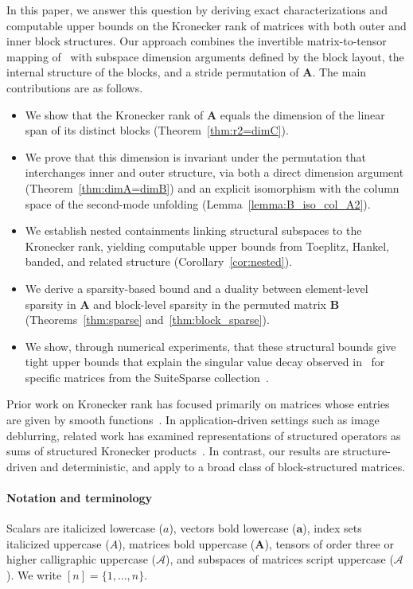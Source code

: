 \documentclass{siamart251216}
\newcommand{\tens}[1]{\mathbf{\mathcal{#1}}}
\def\bA{\mathbf{A}}
\def\bB{\mathbf{B}}
\def\ba{\mathbf{a}}
\begin{document}
In this paper, we answer this question by deriving exact characterizations and computable upper bounds on the Kronecker rank of matrices with both outer and inner block structures. Our approach combines the invertible matrix-to-tensor mapping of~\cite{kilmer2022matrixtensordecomp} with subspace dimension arguments defined by the block layout, the internal structure of the blocks, and a stride permutation of $\bA$. The main contributions are as follows.
\begin{itemize}
    \item We show that the Kronecker rank of $\bA$ equals the dimension of the linear span of its distinct blocks (Theorem~\ref{thm:r2=dimC}).
    \item We prove that this dimension is invariant under the permutation that interchanges inner and outer structure, via both a direct dimension argument (Theorem~\ref{thm:dimA=dimB}) and an explicit isomorphism with the column space of the second-mode unfolding (Lemma~\ref{lemma:B_iso_col_A2}).
    \item We establish nested containments linking structural subspaces to the Kronecker rank, yielding computable upper bounds from Toeplitz, Hankel, banded, and related structure (Corollary~\ref{cor:nested}).
    \item We derive a sparsity-based bound and a duality between element-level sparsity in $\bA$ and block-level sparsity in the permuted matrix $\bB$ (Theorems~\ref{thm:sparse} and~\ref{thm:block_sparse}).
    \item We show, through numerical experiments, that these structural bounds give tight upper bounds that explain the singular value decay observed in~\cite{kilmer2022matrixtensordecomp} for specific matrices from the SuiteSparse collection~\cite{davis2011suite}.
\end{itemize}

Prior work on Kronecker rank has focused primarily on matrices whose entries are given by smooth functions~\cite{hackbusch2004kronecker, Tyrtyshnikov2004KPapprox}. In application-driven settings such as image deblurring, related work has examined representations of structured operators as sums of structured Kronecker products~\cite{kamm1998kronecker, kamm2000optimal, kilmer2007tplush, nagy1996decomposition, nagy2004reflexivekron}. In contrast, our results are structure-driven and deterministic, and apply to a broad class of block-structured matrices.

\paragraph{Notation and terminology}
Scalars are italicized lowercase ($a$), vectors bold lowercase ($\ba$), index sets italicized
uppercase ($A$), matrices bold uppercase ($\bA$), tensors of order three or higher calligraphic
uppercase ($\tens{A}$), and subspaces of matrices script uppercase ($\mathscr{A}$).  We write
$[n] = \{1,\dots,n\}$.
\end{document}

